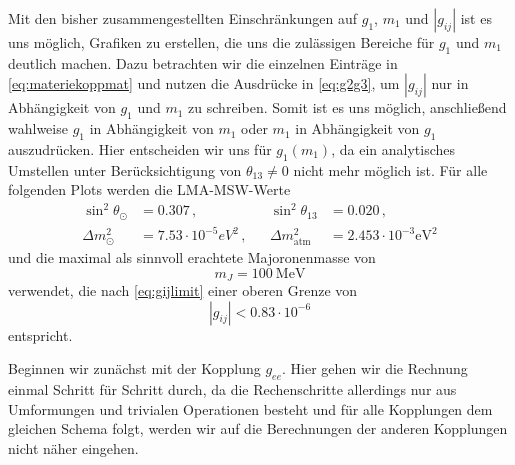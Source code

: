 Mit den bisher zusammengestellten Einschränkungen auf $g_1$, $m_1$ und $|g_{i j}|$ ist es uns möglich, Grafiken zu erstellen, die uns die zulässigen Bereiche für $g_1$ und $m_1$ deutlich machen.
Dazu betrachten wir die einzelnen Einträge in \eqref{eq:materiekoppmat} und nutzen die Ausdrücke in \eqref{eq:g2g3}, um $|g_{i j}|$ nur in Abhängigkeit von $g_1$ und $m_1$ zu schreiben.
Somit ist es uns möglich, anschließend wahlweise $g_1$ in Abhängigkeit von $m_1$ oder $m_1$ in Abhängigkeit von $g_1$ auszudrücken.
Hier entscheiden wir uns für $g_1 (m_1)$, da ein analytisches Umstellen unter Berücksichtigung von $\theta_{1 3} \neq 0$ nicht mehr möglich ist.
Für alle folgenden Plots werden die LMA-MSW-Werte
\begin{align}
    \sin^2\theta_\odot &= \num{0.307}\,, && \sin^2\theta_{13} &= \num{0.020}\,, \\ \Delta m^2_\odot &= \num{7.53} \cdot 10^{-5} \si{eV}^2\,, && \Delta m^2_\text{atm} &= \num{2.453} \cdot 10^{-3} \si{\eV}^2
    \label{eq:LMAMSW}
\end{align}
und die maximal als sinnvoll erachtete Majoronenmasse von 
\begin{equation*}
    m_J = \SI{100}{\mega\eV}
\end{equation*}
\cite{neutrinospdg, newlimit} verwendet, die nach \eqref{eq:gijlimit} einer oberen Grenze von
\begin{equation*}
    |g_{ij}| < \num{0.83} \cdot 10^{-6}
\end{equation*}
entspricht.

Beginnen wir zunächst mit der Kopplung $g_{ee}$.
Hier gehen wir die Rechnung einmal Schritt für Schritt durch, da die Rechenschritte allerdings nur aus Umformungen und trivialen Operationen besteht und für alle Kopplungen dem gleichen Schema folgt, werden wir auf die Berechnungen der anderen
Kopplungen nicht näher eingehen.

